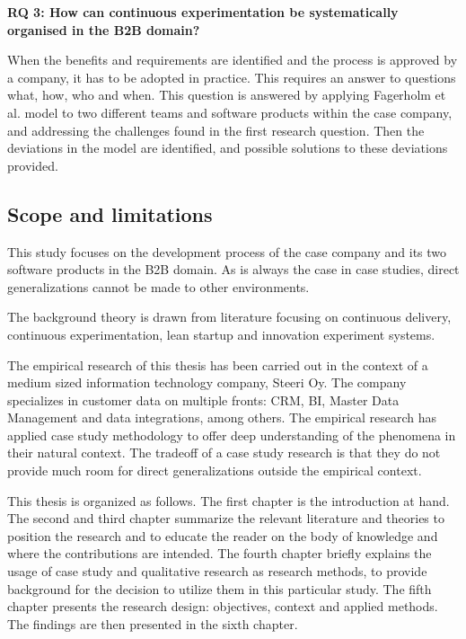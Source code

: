 \documentclass[english]{tktltiki2}
\theoremstyle{definition}
\theoremstyle{remark}
\begin{document}
\noindent \textbf{RQ 3: How can continuous experimentation be systematically organised in the B2B domain?}

\noindent When the benefits and requirements are identified and the process is approved by a company, it has to be adopted in practice. This requires an answer to questions what, how, who and when. This question is answered by applying Fagerholm et al. model \cite{fagerholm2014building} to two different teams and software products within the case company, and addressing the challenges found in the first research question. Then the deviations in the model are identified, and possible solutions to these deviations provided. \newline

\subsection{Scope and limitations}
This study focuses on the development process of the case company and its two software products in the B2B domain. As is always the case in case studies, direct generalizations cannot be made to other environments.

The background theory is drawn from literature focusing on continuous delivery, continuous experimentation, lean startup and innovation experiment systems. 

The empirical research of this thesis has been carried out in the context of a medium sized information technology company, Steeri Oy. The company specializes in customer data on multiple fronts: CRM, BI, Master Data Management and data integrations, among others. The empirical research has applied case study methodology to offer deep understanding of the phenomena in their natural context. The tradeoff of a case study research is that they do not provide much room for direct generalizations outside the empirical context. 

This thesis is organized as follows. The first chapter is the introduction at hand. The second and third chapter summarize the relevant literature and theories to position the research and to educate the reader on the body of knowledge and where the contributions are intended. The fourth chapter briefly explains the usage of case study and qualitative research as research methods, to provide background for the decision to utilize them in this particular study. The fifth chapter presents the research design: objectives, context and applied methods. The findings are then presented in the sixth chapter. 
%
\end{document}
